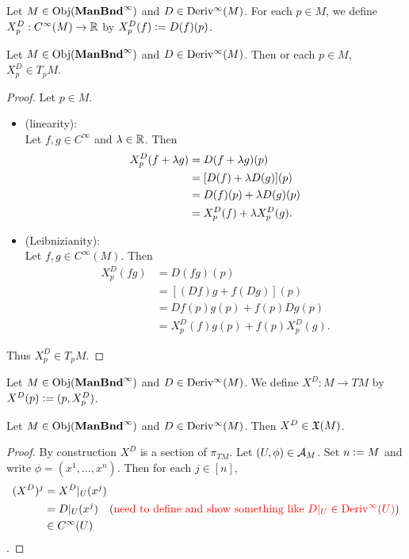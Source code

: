 \documentclass{book}
\begin{document}
\begin{defn}
	Let $M \in \operatorname{Obj}(\operatorname*{\text{\textbf{ManBnd}}^{\infty}})$ and $D \in \operatorname{Deriv^{\infty}}(M)$. For each $p \in M$, we define $X^D_p : C^{\infty}(M) \rightarrow \mathbb{R}$ by $X^D_p(f) \vcentcolon= D(f)(p)$.
\end{defn}

\begin{ex}
	Let $M \in \operatorname{Obj}(\operatorname*{\text{\textbf{ManBnd}}^{\infty}})$ and $D \in \operatorname{Deriv^{\infty}}(M)$. Then or each $p \in M$, $X^D_p \in T_pM$.
\end{ex}

\begin{proof}
	Let $p \in M$.
	\begin{itemize}
		\item (linearity): \\
		Let $f, g \in C^{\infty}$ and $\lambda \in \mathbb{R}$. Then 
		\begin{align*}
			X^D_p(f + \lambda g)
			& = D(f + \lambda g)(p) \\
			& = [D(f) + \lambda D(g)](p) \\
			& = D(f)(p) + \lambda D(g)(p) \\
			& = X^D_p(f) + \lambda X^D_p(g).
		\end{align*}
		\item (Leibnizianity): \\
		Let $f,g \in C^{\infty}(M)$. Then 
		\begin{align*}
			X^D_p(fg)
			& = D(fg)(p) \\
			& = [(Df)g + f(Dg)](p) \\
			& = Df(p)g(p) + f(p)Dg(p) \\
			& = X^D_p(f)g(p) + f(p)X^D_p(g).
		\end{align*}
	\end{itemize}
	Thus $X^D_p \in T_pM$. 
\end{proof}

\begin{defn}
	Let $M \in \operatorname{Obj}(\operatorname*{\text{\textbf{ManBnd}}^{\infty}})$ and $D \in \operatorname{Deriv^{\infty}}(M)$. We define $X^D:M \rightarrow TM$ by $X^D(p) \vcentcolon= (p, X^D_p)$.
\end{defn}

\begin{ex}
	Let $M \in \operatorname{Obj}(\operatorname*{\text{\textbf{ManBnd}}^{\infty}})$ and $D \in \operatorname{Deriv^{\infty}}(M)$. Then $X^D \in \mathfrak{X}(M)$.
\end{ex}

\begin{proof}
	By construction $X^D$ is a section of $\pi_{TM}$. Let $(U, \phi) \in \mathcal{A}_M$. Set $n \vcentcolon= M$ and write $\phi = (x^1, \ldots, x^n)$. Then for each $j \in [n]$, 
	\begin{align*}
		(X^D)^j
		& = X^D|_U(x^j) \\
		& = D|_U(x^j) \quad \text{(\textcolor{red}{need to define and show something like $D|_U \in \operatorname{Deriv^{\infty}}(U)$})} \\
		& \in C^{\infty}(U)
	\end{align*}
	.
\end{proof}
\end{document}
